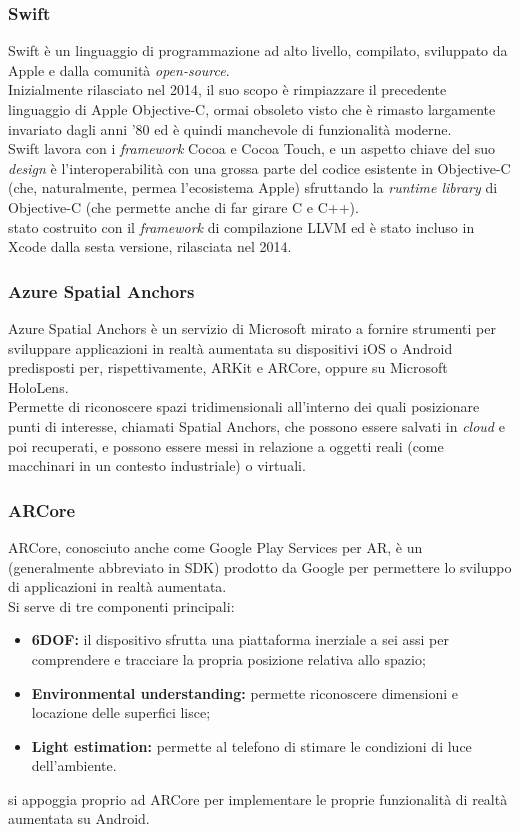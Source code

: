 \subsubsection{Swift}
Swift è un linguaggio di programmazione ad alto livello, compilato, sviluppato da Apple e dalla comunità \textit{open-source}.\\
Inizialmente rilasciato nel 2014, il suo scopo è rimpiazzare il precedente linguaggio di Apple Objective-C, ormai obsoleto visto che è rimasto largamente invariato dagli anni '80 ed è quindi manchevole di funzionalità moderne.\\
Swift lavora con i \textit{framework} Cocoa e Cocoa Touch, e un aspetto chiave del suo \textit{design} è l'interoperabilità con una grossa parte del codice esistente in Objective-C (che, naturalmente, permea l'ecosistema Apple) sfruttando la \textit{runtime library} di Objective-C (che permette anche di far girare C e C++).\\
\e{} stato costruito con il \textit{framework} di compilazione LLVM ed è stato incluso in Xcode dalla sesta versione, rilasciata nel 2014.

\subsubsection{Azure Spatial Anchors}
Azure Spatial Anchors è un servizio di Microsoft mirato a fornire strumenti per sviluppare applicazioni in realtà aumentata su dispositivi iOS o Android predisposti per, rispettivamente, ARKit e ARCore, oppure su Microsoft HoloLens.\\
Permette di riconoscere spazi tridimensionali all'interno dei quali posizionare punti di interesse, chiamati Spatial Anchors, che possono essere salvati in \textit{cloud} e poi recuperati, e possono essere messi in relazione a oggetti reali (come macchinari in un contesto industriale) o virtuali.

\subsubsection{ARCore}
ARCore, conosciuto anche come Google Play Services per AR, è un \sdk{} (generalmente abbreviato in SDK) prodotto da Google per permettere lo sviluppo di applicazioni in realtà aumentata.\\
Si serve di tre componenti principali:
\begin{itemize}
    \item \textbf{6DOF:} il dispositivo sfrutta una piattaforma inerziale a sei assi per comprendere e tracciare la propria posizione relativa allo spazio;
    \item \textbf{Environmental understanding:} permette riconoscere dimensioni e locazione delle superfici lisce;
    \item \textbf{Light estimation:} permette al telefono di stimare le condizioni di luce dell'ambiente.
\end{itemize}
\asa{} si appoggia proprio ad ARCore per implementare le proprie funzionalità di realtà aumentata su Android.

